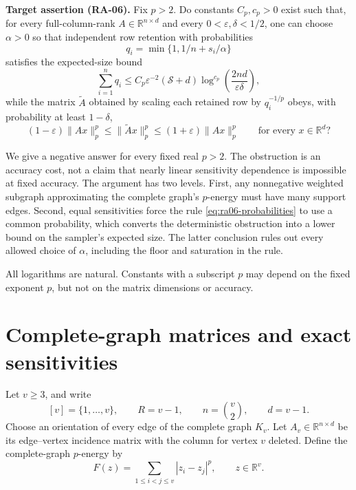 \documentclass[11pt]{article}
\theoremstyle{spaced}
\numberwithin{equation}{section}
\newcommand{\R}{\mathbb{R}}
\newcommand{\Sp}{\mathcal{S}}
\begin{document}
\medskip
\noindent\textbf{Target assertion (RA-06).}
Fix $p>2$. Do constants $C_p,c_p>0$ exist such that, for every
full-column-rank $A\in\R^{n\times d}$ and every
$0<\varepsilon,\delta<1/2$, one can choose $\alpha>0$ so that independent
row retention with probabilities
\begin{equation}\label{eq:ra06-probabilities}
 q_i=\min\{1,1/n+s_i/\alpha\}
\end{equation}
satisfies the expected-size bound
\begin{equation}\label{eq:ra06-budget}
 \sum_{i=1}^n q_i
 \le C_p\varepsilon^{-2}(\Sp+d)
      \log^{c_p}\!\left(\frac{2nd}{\varepsilon\delta}\right),
\end{equation}
while the matrix $\widetilde A$ obtained by scaling each retained row by
$q_i^{-1/p}$ obeys, with probability at least $1-\delta$,
\begin{equation}\label{eq:matrix-embedding}
 (1-\varepsilon)\|Ax\|_p^p
 \le \|\widetilde Ax\|_p^p
 \le (1+\varepsilon)\|Ax\|_p^p
 \qquad\text{for every }x\in\R^d?
\end{equation}
\medskip

We give a negative answer for every fixed real $p>2$. The obstruction is
an accuracy cost, not a claim that nearly linear sensitivity dependence
is impossible at fixed accuracy. The argument has two levels. First,
any nonnegative weighted subgraph approximating the complete graph's
$p$-energy must have many support edges. Second, equal sensitivities
force the rule \eqref{eq:ra06-probabilities} to use a common probability,
which converts the deterministic obstruction into a lower bound on the
sampler's expected size. The latter conclusion rules out every allowed
choice of $\alpha$, including the floor and saturation in the rule.

All logarithms are natural. Constants with a subscript $p$ may depend
on the fixed exponent $p$, but not on the matrix dimensions or accuracy.

\section{Complete-graph matrices and exact sensitivities}\label{sec:matrix}

Let $v\ge3$, and write
\[
 [v]=\{1,\ldots,v\},\qquad R=v-1,\qquad
 n=\binom v2,\qquad d=v-1.
\]
Choose an orientation of every edge of the complete graph $K_v$.
Let $A_v\in\R^{n\times d}$ be its edge--vertex incidence matrix with the
column for vertex $v$ deleted. Define the complete-graph $p$-energy by
\begin{equation}\label{eq:complete-energy}
 F(z)=\sum_{1\le i<j\le v}|z_i-z_j|^p,
 \qquad z\in\R^v.
\end{equation}
\end{document}
